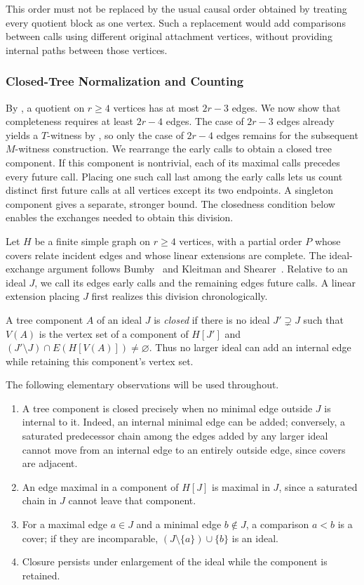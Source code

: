 \documentclass[USenglish, a4paper, thm-restate,numberwithinsect, cleveref]{lipics-v2021}
\begin{document}
This order must not be replaced by the usual causal order obtained by
treating every quotient block as one vertex. Such a replacement would
add comparisons between calls using different original attachment
vertices, without providing internal paths between those vertices.

\subsubsection{Closed-Tree Normalization and Counting}

By , a quotient on $r\geq4$ vertices
has at most $2r-3$ edges. We now show that completeness requires at
least $2r-4$ edges. The case of $2r-3$ edges already yields a
$T$-witness by , so only the case of
$2r-4$ edges remains for the subsequent $M$-witness construction.
We rearrange the early calls
to obtain a closed tree component. If this component is nontrivial,
each of its maximal calls precedes every future call. Placing one
such call last among the early calls lets us count distinct first
future calls at all vertices except its two endpoints. A singleton
component gives a separate, stronger bound. The closedness condition
below enables the exchanges needed to obtain this division.

Let $H$ be a finite simple graph on $r\ge4$ vertices, with a partial
order $P$ whose covers relate incident edges and whose linear
extensions are complete. The ideal-exchange argument follows
Bumby~\cite{Bumby81} and Kleitman and Shearer~\cite{KleitmanS80}.
Relative to an ideal $J$, we call its edges early calls and the
remaining edges future calls. A linear extension placing $J$ first
realizes this division chronologically.

A tree component $A$ of an ideal $J$ is
\emph{closed} if there is no ideal $J'\supsetneq J$ such that
$V(A)$ is the vertex set of a component of $H[J']$ and
$(J'\setminus J)\cap E(H[V(A)])\neq\varnothing$. Thus no larger
ideal can add an internal edge while retaining this component's vertex set.

The following elementary observations will be used throughout.
\begin{enumerate}
\item A tree component is closed precisely when no minimal edge outside
$J$ is internal to it. Indeed, an internal minimal edge can be added;
conversely, a saturated predecessor chain among the edges added by
any larger ideal cannot move from an internal edge to an entirely
outside edge, since covers are adjacent.
\item An edge maximal in a
component of $H[J]$ is maximal in $J$, since a saturated chain in $J$
cannot leave that component.
\item For a maximal edge $a\in J$ and a
minimal edge $b\notin J$, a comparison $a<b$ is a cover; if they
are incomparable, $(J\setminus\{a\})\cup\{b\}$ is an ideal.
\item Closure persists
under enlargement of the ideal while the component is retained.
\end{enumerate}
\end{document}
